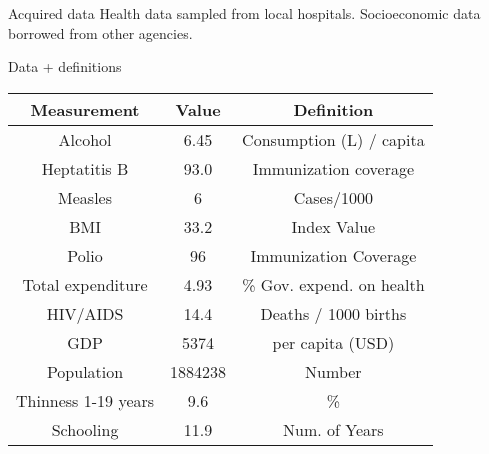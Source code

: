 \documentclass{beamer}
\begin{document}
\begin{frame}{Acquired data}
	Health data sampled from local hospitals. Socioeconomic data borrowed from other agencies.
	
	\begin{block}{Data + definitions}
		\begin{adjustbox}{max totalsize={.9\textwidth}{.7\textheight},center}
			
			\begin{tabular}{|c|c|c|}
				\hline
				\textbf{Measurement} &  \textbf{Value} & \textbf{Definition} \\
				\hline
				Alcohol & 6.45 & Consumption (L) / capita \\
				\hline
				Heptatitis B & 93.0 & Immunization coverage  \\
				\hline
				Measles & 6 & Cases/1000 \\
				\hline
				BMI & 33.2 & Index Value  \\
				\hline
				Polio & 96 & Immunization Coverage \\
				\hline
				Total expenditure & 4.93 & \% Gov. expend. on health  \\
				\hline
				HIV/AIDS & 14.4 & Deaths / 1000 births  \\
				\hline
				GDP & 5374 & per capita (USD)   \\
				\hline
				Population & 1884238 & Number  \\
				\hline
				Thinness 1-19 years & 9.6 &\% \\
				\hline
				Schooling & 11.9 & Num. of Years \\
				\hline
		
				
			\end{tabular}
			
		\end{adjustbox}
	\end{block}
	
\end{frame}
\end{document}
